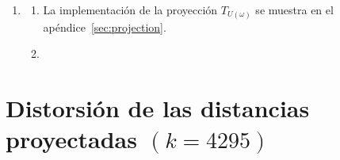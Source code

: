 \begin{enumerate}
	      \begin{equation*}
		      n^2 \exp\left( - \frac{k\varepsilon^2}{4} \right) \leq n^2 \exp\left( - \frac{48 \log n}{4} \right) = n^2 e^{-12 \log n} = n^{-10} \leq \frac{1}{n}.
	      \end{equation*}
	      Por lo tanto, la probabilidad de que todos los pares preserven sus distancias dentro de un factor $(1 \pm \varepsilon)$ es al menos $1 - 1/n$.

	\item

	      \begin{enumerate}
		      \item

		            La implementación de la proyección $T_{U\left(\omega\right)}$ se muestra en el apéndice~\ref{sec:projection}.

		      \item

		            \begin{listing}[ht!]
			            \tiny
			            \centering
			            \inputminted[frame=single,framesep=10pt]{text}{johnson.txt}
			            \caption{Comparación del error empírico y de la cota teórica de Johnson-Lindenstrauss para diferentes valores de $k$.}
			            \label{lst:results3a}
		            \end{listing}
	      \end{enumerate}
\end{enumerate}

\section{Distorsión de las distancias proyectadas $\left(k=4295\right)$}

